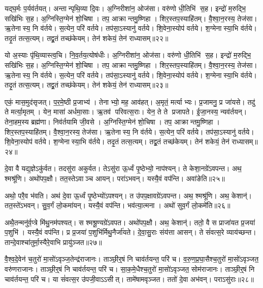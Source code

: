 यद्घ॒र्मः प॒र्यव॑र्तयत्।
अन्तान्पृथि॒व्या दि॒वः।
अ॒ग्निरीशा॑न॒ ओज॑सा।
वरु॑णो धी॒तिभि॑ स॒ह।
इन्द्रो॑ म॒रुद्भि॒ सखि॑भिः स॒ह।
अ॒ग्निस्ति॒ग्मेन॑ शो॒चिषा।
तप॒ आक्रान्तमु॒ष्णिहा।
शिर॒स्तप॒स्याहि॑तम्।
वै॒श्वा॒न॒रस्य॒ तेज॑सा।
ऋ॒तेनास्य॒ नि व॑र्तये।
स॒त्येन॒ परि॑ वर्तये।
तप॑सा॒ऽस्यानु॑ वर्तये।
शि॒वेना॒स्योप॑ वर्तये।
श॒ग्मेनास्या॒भि व॑र्तये।
तदृ॒तं तत्स॒त्यम्।
तद्व्र॒तं तच्छ॑केयम्।
तेन॑ शकेयं॒ तेन॑ राध्यासम्॥२२॥

यो अ॒स्याः पृ॑थि॒व्यास्त्व॒चि।
नि॒व॒र्तय॒त्योष॑धीः।
अ॒ग्निरीशा॑न॒ ओज॑सा।
वरु॑णो धी॒तिभि॑ स॒ह।
इन्द्रो॑ म॒रुद्भि॒ सखि॑भिः स॒ह।
अ॒ग्निस्ति॒ग्मेन॑ शो॒चिषा।
तप॒ आक्रान्तमु॒ष्णिहा।
शिर॒स्तप॒स्याहि॑तम्।
वै॒श्वा॒न॒रस्य॒ तेज॑सा।
ऋ॒तेनास्य॒ नि व॑र्तये।
स॒त्येन॒ परि॑ वर्तये।
तप॑सा॒ऽस्यानु॑ वर्तये।
शि॒वेना॒स्योप॑ वर्तये।
श॒ग्मेनास्या॒भि व॑र्तये।
तदृ॒तं तत्स॒त्यम्।
तद्व्र॒तं तच्छ॑केयम्।
तेन॑ शकेयं॒ तेन॑ राध्यासम्॥२३॥

एकं॒ मास॒मुद॑सृजत्।
प॒र॒मे॒ष्ठी प्र॒जाभ्य॑।
तेनाभ्यो॒ मह॒ आव॑हत्।
अ॒मृतं॒ मर्त्याभ्यः।
प्र॒जामनु॒ प्र जा॑यसे।
तदु॑ ते मर्त्या॒मृतम्।
येन॒ मासा॑ अर्धमा॒साः।
ऋ॒तव॑ परिवत्स॒राः।
येन॒ ते ते प्रजापते।
ई॒जा॒नस्य॒ न्यव॑र्तयन्।
तेना॒हम॒स्य ब्रह्म॑णा।
निव॑र्तयामि जी॒वसे।
अ॒ग्निस्ति॒ग्मेन॑ शो॒चिषा।
तप॒ आक्रान्तमु॒ष्णिहा।
शिर॒स्तप॒स्याहि॑तम्।
वै॒श्वा॒न॒रस्य॒ तेज॑सा।
ऋ॒तेनास्य॒ नि व॑र्तये।
स॒त्येन॒ परि॑ वर्तये।
तप॑सा॒ऽस्यानु॑ वर्तये।
शि॒वेना॒स्योप॑ वर्तये।
श॒ग्मेनास्या॒भि व॑र्तये।
तदृ॒तं तत्स॒त्यम्।
तद्व्र॒तं तच्छ॑केयम्।
तेन॑ शकेयं॒ तेन॑ राध्यासम्॥२४॥

दे॒वा वै यद्य॒ज्ञेऽकु॑र्वत।
तदसु॑रा अकुर्वत।
तेऽसु॑रा ऊ॒र्ध्वं पृ॒ष्ठेभ्यो॒ नाप॑श्यन्।
ते केशा॒नग्रे॑ऽवपन्त।
अथ॒ श्मश्रू॑णि।
अथो॑पप॒क्षौ।
तत॒स्तेऽवाञ्च आयन्।
परा॑ऽभवन्।
यस्यै॒वं वप॑न्ति।
अवा॑ङेति॥२५॥

अथो॒ परै॒व भ॑वति।
अथ॑ दे॒वा ऊ॒र्ध्वं पृ॒ष्ठेभ्यो॑ऽपश्यन्।
त उ॑पप॒क्षावग्रे॑ऽवपन्त।
अथ॒ श्मश्रू॑णि।
अथ॒ केशान्॑।
तत॒स्ते॑ऽभवन्।
सु॒व॒र्गं लो॒कमा॑यन्।
यस्यै॒वं वप॑न्ति।
भव॑त्या॒त्मना।
अथो॑ सुव॒र्गं लो॒कमे॑ति॥२६॥

अथै॒तन्मनु॑र्व॒प्त्रे मि॑थु॒नम॑पश्यत्।
स श्मश्रू॒ण्यग्रे॑ऽवपत।
अथो॑पप॒क्षौ।
अथ॒ केशान्॑।
ततो॒ वै स प्राजा॑यत प्र॒जया॑ प॒शुभि॑।
यस्यै॒वं वप॑न्ति।
प्र प्र॒जया॑ प॒शुभि॑र्मिथु॒नैर्जा॑यते।
दे॒वा॒सु॒राः संय॑त्ता आसन्।
ते सं॑वत्स॒रे व्याय॑च्छन्त।
तान्दे॒वाश्चा॑तुर्मा॒स्यैरे॒वाभि प्रायु॑ञ्जत॥२७॥

वै॒श्व॒दे॒वेन॑ च॒तुरो॑ मा॒सो॑ऽवृञ्ज॒तेन्द्र॑राजानः।
ताञ्छी॒र्॒षं नि चाव॑र्तयन्त॒ परि॑ च।
व॒रु॒ण॒प्र॒घा॒सैश्च॒तुरो॑ मा॒सो॑ऽवृञ्जत॒ वरु॑णराजानः।
ताञ्छी॒र्॒षं नि चाव॑र्तयन्त॒ परि॑ च।
सा॒क॒मे॒धैश्च॒तुरो॑ मा॒सो॑ऽवृञ्जत॒ सोम॑राजानः।
ताञ्छी॒र्॒षं नि चाव॑र्तयन्त॒ परि॑ च।
या सं॑वत्स॒र उ॑पजी॒वाऽऽसीत्।
तामे॑षामवृञ्जत।
ततो॑ दे॒वा अभ॑वन्।
पराऽसु॑राः॥२८॥

